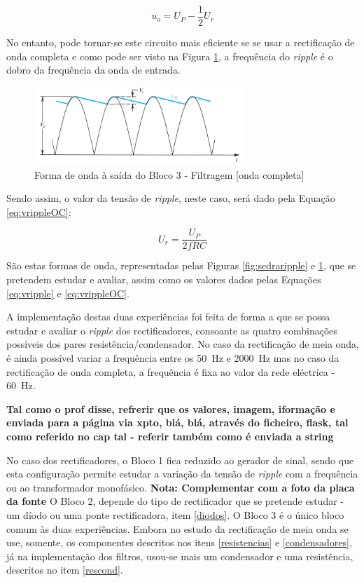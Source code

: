\begin{equation} \label{eq:tensaosaida}
	u_{o} = U_{P} - \dfrac{1}{2}U_{r}	
\end{equation}

No entanto, pode tornar-se este circuito mais eficiente se se usar a rectificação de onda completa e como pode ser visto na Figura \ref{fig:sedraripplecompleta}, a frequência do \textit{ripple} é o dobro da frequência da onda de entrada.

\begin{figure}[hbtp]
	\centering
	\includegraphics[width=0.7\textwidth]{figures/sedra_ripple_OC.png}
	\caption{Forma de onda à saída do Bloco 3 - Filtragem [onda completa] \cite{sedrasmith}}
	\label{fig:sedraripplecompleta}
\end{figure}

Sendo assim, o valor da tensão de \textit{ripple}, neste caso, será dado pela Equação \ref{eq:vrippleOC}:

\begin{equation} \label{eq:vrippleOC}
	U_{r} = \frac{U_{P}}{2fRC}
\end{equation}

São estas formas de onda, representadas pelas Figuras \ref{fig:sedraripple} e \ref{fig:sedraripplecompleta}, que se pretendem estudar e avaliar, assim como os valores dados pelas Equações \ref{eq:vripple} e \ref{eq:vrippleOC}.

A implementação destas duas experiências foi feita de forma a que se possa estudar e avaliar o \textit{ripple} dos rectificadores, consoante as quatro combinações possíveis dos pares resistência/condensador. No caso da rectificação de meia onda, é ainda possível variar a frequência entre os \SI{50}{\hertz} e \SI{2000}{\hertz} mas no caso da rectificação de onda completa, a frequência é fixa ao valor da rede eléctrica - \SI{60}{\hertz}.

\textbf{Tal como o prof disse, refrerir que os valores, imagem, iformação e enviada para a página via xpto, blá, blá, através do ficheiro, flask, tal como referido no cap tal - referir também como é enviada a string}

No caso dos rectificadores, o Bloco 1 fica reduzido ao gerador de sinal, sendo que esta configuração permite estudar a variação da tensão de \textit{ripple} com a frequência ou ao transformador monofásico. \textbf{Nota: Complementar com a foto da placa da fonte} O Bloco 2, depende do tipo de rectificador que se pretende estudar - um díodo ou uma ponte rectificadora, item \ref{diodos}. O Bloco 3 é o único bloco comum às duas experiências. Embora no estudo da rectificação de meia onda se use, somente, os componentes descritos nos itens \ref{resistencias} e \ref{condensadores}, já na implementação dos filtros, usou-se mais um condensador e uma resistência, descritos no item \ref{rescond}. 

